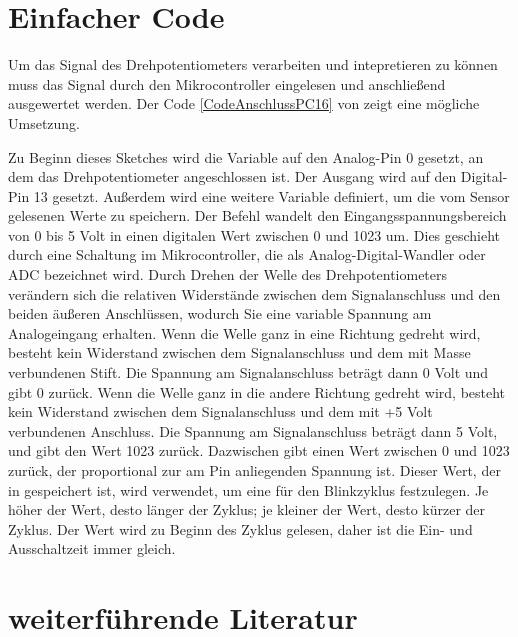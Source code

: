 \section{Einfacher Code}
\label{sec:codePoti}
Um das Signal des Drehpotentiometers verarbeiten und intepretieren zu können muss das Signal durch den Mikrocontroller eingelesen und anschließend ausgewertet werden. Der Code \ref{CodeAnschlussPC16} von \cite{ArduinoAnalog:2026} zeigt eine mögliche Umsetzung. 

Zu Beginn dieses Sketches wird die Variable  auf den Analog-Pin 0 gesetzt, an dem das Drehpotentiometer angeschlossen ist. Der Ausgang  wird auf den Digital-Pin 13 gesetzt. Außerdem wird eine weitere Variable  definiert, um die vom Sensor gelesenen Werte zu speichern.
Der Befehl  wandelt den Eingangsspannungsbereich von 0 bis 5 Volt in einen digitalen Wert zwischen 0 und 1023 um. Dies geschieht durch eine Schaltung im Mikrocontroller, die als Analog-Digital-Wandler oder ADC bezeichnet wird.
Durch Drehen der Welle des Drehpotentiometers verändern sich die relativen Widerstände zwischen dem Signalanschluss und den beiden äußeren Anschlüssen, wodurch Sie eine variable Spannung am Analogeingang erhalten. Wenn die Welle ganz in eine Richtung gedreht wird, besteht kein Widerstand zwischen dem Signalanschluss und dem mit Masse verbundenen Stift. Die Spannung am Signalanschluss beträgt dann 0 Volt und  gibt 0 zurück. Wenn die Welle ganz in die andere Richtung gedreht wird, besteht kein Widerstand zwischen dem Signalanschluss und dem mit +5 Volt verbundenen Anschluss. 
Die Spannung am Signalanschluss beträgt dann 5 Volt, und  gibt den Wert 1023 zurück. Dazwischen gibt  einen Wert zwischen 0 und 1023 zurück, der proportional zur am Pin anliegenden Spannung ist.
Dieser Wert, der in  gespeichert ist, wird verwendet, um eine  für den Blinkzyklus festzulegen. Je höher der Wert, desto länger der Zyklus; je kleiner der Wert, desto kürzer der Zyklus. Der Wert wird zu Beginn des Zyklus gelesen, daher ist die Ein- und Ausschaltzeit immer gleich.


\begin{center}
	\label{CodeAnschlussPC16}
\end{center}

\section{weiterführende Literatur} 
\begin{center}
	\begin{enumerate}
		
		
	\end{enumerate}
\end{center}

